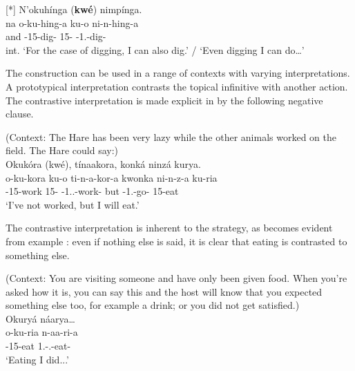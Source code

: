 \documentclass[output=paper]{langscibook}
\begin{document}
\ex
[*]{
\label{bkm:Ref98832788:b}
N’okuhínga (\textbf{kwé}) nimpínga.\\
\gll
na  o-ku-hing-a  ku-o  ni-n-hing-a\\
and  \AUG{}-{}15-dig-\FV{}  15-\CM{}  \IPFV{}-1\SG{}.\SM{}-{}dig-\FV{}\\
\glt
int. ‘For the case of digging, I can also dig.’ / ‘Even digging I can do…’\\
}


\z
\z

The construction can be used in a range of contexts with varying interpretations. A prototypical interpretation contrasts the topical infinitive with another action. The contrastive interpretation is made explicit in  by the following negative clause.

\ea
\label{bkm:Ref98833538}
(Context: The Hare has been very lazy while the other animals worked on the field. The Hare could say:)\\
Okukóra (kwé), tínaakora, konká ninzá kurya.\\
\gll
o-ku-kora  ku-o  ti-n-a-kor-a  kwonka  ni-n-z-a  ku-ria\\
\AUG{}-15-work  15-\CM{}  \NEG{}-1\SG{}.\SM{}\N.\PST{}-work-\FV{}  but  \IPFV{}-1\SG{}.\SM{}-go-\FV{}  15-eat\\
\glt
‘I’ve not worked, but I will eat.’\\


\z

The contrastive interpretation is inherent to the strategy, as becomes evident from example : even if nothing else is said, it is clear that eating is contrasted to something else.

\ea
\label{bkm:Ref98833573}
(Context: You are visiting someone and have only been given food. When you’re asked how it is, you can say this and the host will know that you expected something else too, for example a drink; or you did not get satisfied.)\\
Okuryá náarya…\\
\gll
o-ku-ria  n-aa-ri-a\\
\AUG{}-15-eat  1\SG{}.\SM{}-\N{}.\PST{}-eat-\FV{}\\
\glt
‘Eating I did...’\\
\end{document}

